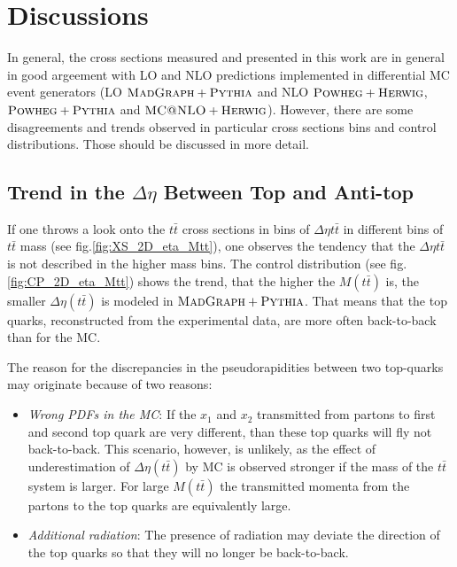 \chapter{Discussions}

In general, the cross sections measured and presented in this work are in general in good argeement with LO and NLO predictions
implemented in differential MC event generators (LO $\textsc{MadGraph}+\textsc{Pythia}$ and NLO $\textsc{Powheg}+\textsc{Herwig}$, $\textsc{Powheg}+\textsc{Pythia}$ and $\textsc{MC@NLO}+\textsc{Herwig}$).
However, there are some disagreements and trends observed in particular cross sections bins and control distributions.
Those should be discussed in more detail.

\section{Trend in the $\Delta\eta$ Between Top and Anti-top} \label{sec:deta_discuss}

If one throws a look onto the $t\bar{t}$ cross sections in bins of $\Delta\eta{t\bar{t}}$ in different bins of $t\bar{t}$ mass
(see fig.\ref{fig:XS_2D_eta_Mtt}), one observes the tendency that the $\Delta\eta{t\bar{t}}$ is not described in the higher mass bins.
The control distribution (see fig. \ref{fig:CP_2D_eta_Mtt}) shows the trend, that the higher the $M(t\bar{t})$ is, the smaller $\Delta\eta(t\bar{t})$
is modeled in $\textsc{MadGraph}+\textsc{Pythia}$. That means that the top quarks, reconstructed from the experimental data, are more often back-to-back 
than for the MC.

The reason for the discrepancies in the pseudorapidities between two top-quarks may originate because of two reasons:

\begin{itemize}
 \item \textit{Wrong PDFs in the MC}: If the $x_{1}$ and $x_{2}$ transmitted from partons to first and second top quark are very different, than these
 top quarks will fly not back-to-back. This scenario, however, is unlikely, as the effect of underestimation of $\Delta\eta(t\bar{t})$
 by MC is observed stronger if the mass of the $t\bar{t}$ system is larger. For large $M(t\bar{t})$ the transmitted momenta from the partons
 to the top quarks are equivalently large.
 
 \item \textit{Additional radiation}: The presence of radiation may deviate the direction of the top quarks so that they will no longer be back-to-back.
\end{itemize}

